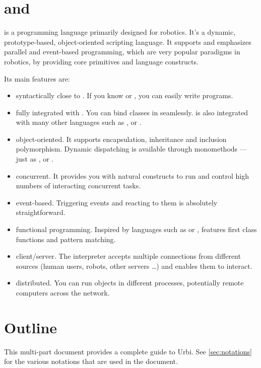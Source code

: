\section{\urbi and \us}

\us is a programming language primarily designed for robotics. It's a
dynamic, prototype-based, object-oriented scripting language. It
supports and emphasizes parallel and event-based programming, which
are very popular paradigms in robotics, by providing core primitives
and language constructs.

Its main features are:
\begin{itemize}
\item syntactically close to \Cxx. If you know \C or \Cxx, you can
  easily write \us programs.
\item fully integrated with \Cxx. You can bind \Cxx classes in \us
  seamlessly. \us is also integrated with many other languages such as
  \java, \matlab or \python.
\item object-oriented. It supports encapsulation, inheritance and
  inclusion polymorphism. Dynamic dispatching is available through
  monomethods --- just as \Cxx, \Cs or \java.
\item concurrent. It provides you with natural constructs to run and
  control high numbers of interacting concurrent tasks.
\item event-based. Triggering events and reacting to them is
  absolutely straightforward.
\item functional programming.  Inspired by languages such as \lisp or
  \caml, \us features first class functions and pattern matching.
\item client/server.  The interpreter accepts multiple connections
  from different sources (human users, robots, other servers \ldots)
  and enables them to interact.
\item distributed.  You can run objects in different processes,
  potentially remote computers across the network.
\end{itemize}

\section{Outline}

This multi-part document provides a complete guide to Urbi.  See
\autoref{sec:notations} for the various notations that are used in the
document.

\newenvironment{partDescription}[2]
{%
  \item[\autoref{#1} --- \nameref{#1}]~\\%
  #2
  \begin{description}%
    \let\itemOrig\item%
    \renewcommand{\item}[1][]{\itemOrig[~~\autoref{##1} --- \nameref{##1}]~\\}%
  }{%
  \end{description}%
}

